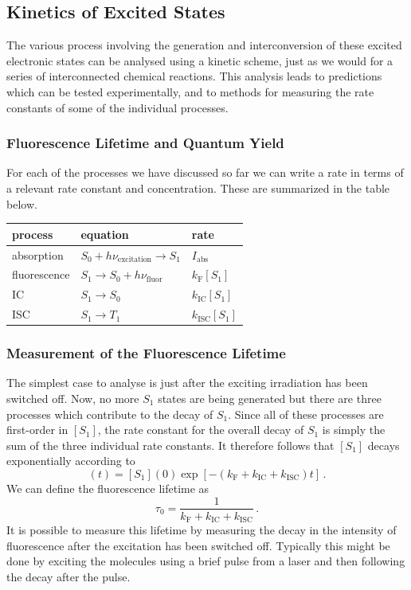 \documentclass{article}
\theoremstyle{plain}\theoremheaderfont{\normalfont\itshape}\theorembodyfont{\rmfamily}\theoremseparator{.}\newtheorem*{rem}{Remark}\newtheorem*{ex}{Example}\newtheorem*{proof}{Proof}\newtheorem*{altp}{Alternative proof}
\theoremstyle{plain}\theoremheaderfont{\normalfont\bfseries}\theorembodyfont{\rmfamily}\theoremseparator{.}\newtheorem{thm}{Theorem}[section]\newtheorem{lem}[thm]{Lemma}\newtheorem{prop}[thm]{Proposition}\newtheorem*{cor}{Corollary}\newtheorem{defn}[thm]{Definition}\newtheorem{clm}[thm]{Claim}\newtheorem{clminproof}{Claim}\newtheorem{pos}{Postulate}[section]
\theoremstyle{break}\theoremheaderfont{\normalfont\itshape}\theorembodyfont{\rmfamily}\theoremseparator{.\medskip}\newtheorem*{proofskip}{Proof}\newtheorem*{exs}{Examples}\newtheorem*{rems}{Remarks}
\theoremstyle{break}\theoremheaderfont{\normalfont\bfseries}\theorembodyfont{\rmfamily}\theoremseparator{.\medskip}\newtheorem{lemskip}[thm]{Lemma}\newtheorem{defnskip}[thm]{Definition}\newtheorem{propskip}[thm]{Proposition}\newtheorem{thmskip}[thm]{Theorem}
\numberwithin{equation}{section}
\newcommand{\FF}{_{\text{F}}}
\newcommand{\IC}{_{\text{IC}}}
\newcommand{\ISC}{_{\text{ISC}}}
\begin{document}
    \subsection{Kinetics of Excited States}
    The various process involving the generation and interconversion of these excited electronic states can be analysed using a kinetic scheme, just as we would for a series of interconnected chemical reactions. This analysis leads to predictions which can be tested experimentally, and to methods for measuring the rate constants of some of the individual processes.

    \subsubsection{Fluorescence Lifetime and Quantum Yield}
    For each of the processes we have discussed so far we can write a rate in terms of a relevant rate constant and concentration. These are summarized in the table below.

    \renewcommand{\arraystretch}{1.2}
    \begin{table}[ht!]
        \centering
        \begin{tabular}{lll}
            \toprule
            process & equation & rate \\ \midrule
            absorption & \(S_0+h\nu_{\text{excitation}}\to S_1\) & \(I_{\text{abs}}\) \\
            fluorescence & \(S_1\to S_0+h\nu_{\text{fluor}}\) & \(k\FF[S_1]\) \\
            IC & \(S_1\to S_0\) & \(k\IC[S_1]\) \\
            ISC & \(S_1\to T_1\) & \(k\ISC[S_1]\) \\ \bottomrule
        \end{tabular}
    \end{table}

    \subsubsection*{Measurement of the Fluorescence Lifetime}
    The simplest case to analyse is just after the exciting irradiation has been switched off. Now, no more \(S_1\) states are being generated but there are three processes which contribute to the decay of \(S_1\). Since all of these processes are first-order in \([S_1]\), the rate constant for the overall decay of \(S_1\) is simply the sum of the three individual rate constants. It therefore follows that \([S_1]\) decays exponentially according to
    \begin{equation}
        [S_1](t)=[S_1](0)\exp\left[-(k\FF+k\IC+k\ISC)t\right]\,.
    \end{equation}
    We can define the fluorescence lifetime as
    \begin{equation}
        \tau_0=\frac{1}{k\FF+k\IC+k\ISC}\,.
    \end{equation}
    It is possible to measure this lifetime by measuring the decay in the intensity of fluorescence after the excitation has been switched off. Typically this might be done by exciting the molecules using a brief pulse from a laser and then following the decay after the pulse.
\end{document}

